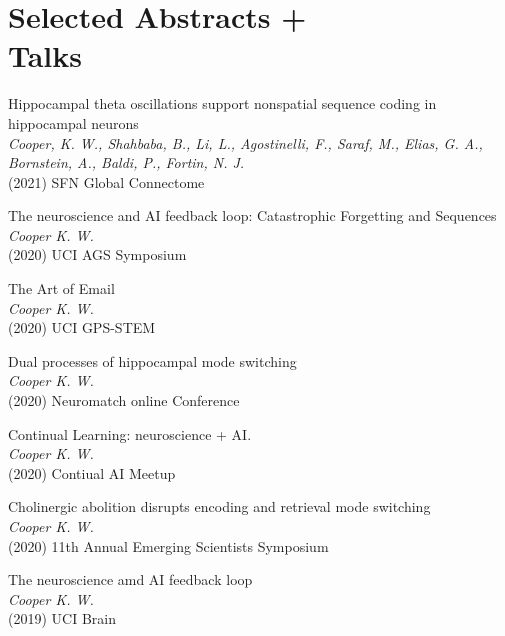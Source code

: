 \documentclass[10pt]{cooperCV2}
\begin{document}
\section{Selected Abstracts +  \\Talks}

 
\begin{etaremune}[itemindent=-\bibhang, topsep=0pt,
				   itemsep=\bibsep,partopsep=0pt,parsep=0pt,leftmargin={\bibhang+\widthof{[999]}}] 
    
    \item Hippocampal theta oscillations support nonspatial sequence coding in hippocampal neurons \\
     \textit{Cooper, K. W., Shahbaba, B., Li, L., Agostinelli, F., Saraf, M., Elias, G. A., Bornstein, A., Baldi, P.,  Fortin, N. J.}\\
     (2021) SFN Global Connectome
     
	
    \item The neuroscience and AI feedback loop: Catastrophic Forgetting and Sequences \\
     \textit{Cooper K. W.}\\
     (2020) UCI AGS Symposium
     
	
    \item The Art of Email \\
     \textit{Cooper K. W.}\\
     (2020) UCI GPS-STEM
     
	
    \item Dual processes of hippocampal mode switching \\
     \textit{Cooper K. W.}\\
     (2020) Neuromatch online Conference
     
	
    \item Continual Learning: neuroscience + AI. \\
     \textit{Cooper K. W.}\\
     (2020) Contiual AI Meetup
     
	
    \item Cholinergic abolition disrupts encoding and retrieval mode switching \\
     \textit{Cooper K. W.}\\
     (2020) 11th Annual Emerging Scientists Symposium
     
	
    \item The neuroscience amd AI feedback loop \\
     \textit{Cooper K. W.}\\
     (2019) UCI Brain
     

\end{etaremune}
\end{document}
